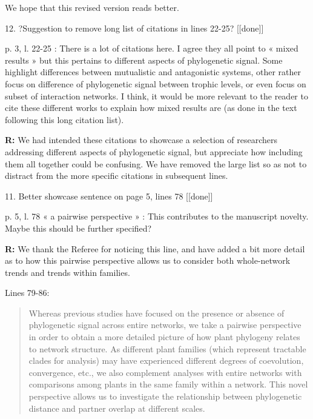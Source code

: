 \documentclass[12pt]{letter}
\newenvironment{refquote}{\bigskip \begin{it}}{\end{it}\smallskip}
\begin{document}
	  	We hope that this revised version reads better.


	12. ?Suggestion to remove long list of citations in lines 22-25? [[done]]

		\begin{refquote}
			p. 3, l. 22-25 : There is a lot of citations here. I agree they all point to « mixed results » but this pertains to different aspects of phylogenetic signal. Some highlight differences between mutualistic and antagonistic systems, other rather focus on difference of phylogenetic signal between trophic levels, or even focus on subset of interaction networks. I think, it would be more relevant to the reader to cite these different works to explain how mixed results are (as done in the text following this long citation list).
		\end{refquote}


		\textbf{R:} We had intended these citations to showcase a selection of researchers addressing different aspects of phylogenetic signal, but appreciate how including them all together could be confusing. We have removed the large list so as not to distract from the more specific citations in subsequent lines.


	11. Better showcase sentence on page 5, lines 78 [[done]]

		\begin{refquote}
			p. 5, l. 78 « a pairwise perspective » : This contributes to the manuscript novelty. Maybe this should be further specified?
		\end{refquote}

		\textbf{R:} We thank the Referee for noticing this line, and have added a bit more detail as to how this pairwise perspective allows us to consider both whole-network trends and trends within families.


		Lines 79-86:

		\begin{quotation}

			Whereas previous 
			studies have focused on the presence or absence of phylogenetic
			signal across entire networks, we take a pairwise perspective in
			order to obtain a more detailed picture of how plant phylogeny
			relates to network structure. As different plant families (which represent tractable clades for analysis) may have experienced different degrees of coevolution, convergence, etc., we also complement analyses with entire networks with comparisons among plants in the same family within a network. 
			This novel perspective allows us to investigate the relationship between phylogenetic distance and partner overlap at different scales. 

		\end{quotation}
\end{document}

